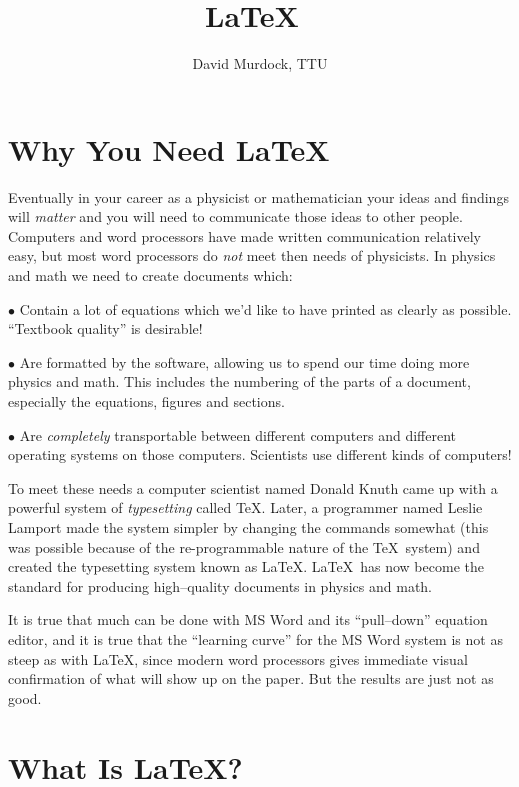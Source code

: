 \documentclass[12pt]{article}
\title{\LaTeX\ }
\author{David Murdock, TTU}
\date{}
\begin{document}
\maketitle

\bigskip\bigskip

\section{Why You Need \LaTeX\ }

Eventually in your career as a physicist or mathematician your
ideas and findings will {\it matter\/} and you will need to
communicate those ideas to other people.  Computers and word
processors have made written communication relatively easy, but
most word processors do {\it not\/} meet then needs of physicists.
In physics and math we need to create documents which:

\smallskip
\noindent $\bullet$ Contain a lot of equations which we'd like to
have printed as clearly as possible.  ``Textbook quality'' is
desirable!

\smallskip
\noindent $\bullet$ Are formatted by the software, allowing us to
spend our time doing more physics and math. This includes the
numbering of the parts of a document, especially the equations,
figures and sections.

\smallskip
\noindent $\bullet$ Are {\it completely\/} transportable between
different computers and different operating systems on those
computers.  Scientists use different kinds of computers!

\smallskip
To meet these needs a computer scientist named Donald Knuth came
up with a powerful system of {\it typesetting\/} called \TeX.
Later, a programmer named Leslie Lamport made the system simpler
by changing the commands somewhat (this was possible because of
the re-programmable nature of the \TeX\ system) and created the
typesetting system known as \LaTeX.  \LaTeX\ has now become the
standard for producing high--quality documents in physics and
math.

It is true that much can be done with MS Word and its
``pull--down'' equation editor, and it is true that the ``learning
curve'' for the MS Word system is not as steep as with \LaTeX,
since modern word processors gives immediate visual confirmation
of what will show up on the paper. But the results are just not as
good.

\section{What Is \LaTeX?}
\end{document}
